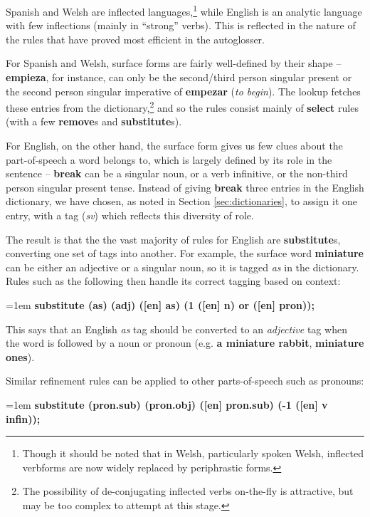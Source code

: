 \documentclass[11pt]{article}
\begin{document}
Spanish and Welsh are inflected languages,\footnote{Though it should be noted that in Welsh, particularly spoken Welsh, inflected verbforms are now widely replaced by periphrastic forms.} while English is an analytic language with few inflections (mainly in ``strong'' verbs).  This is reflected in the nature of the rules that have proved most efficient in the autoglosser.

For Spanish and Welsh, surface forms are fairly well-defined by their shape -- \textbf{empieza}, for instance, can only be the second/third person singular present or the second person singular imperative of \textbf{empezar} (\textit{to begin}).  The lookup fetches these entries from the dictionary,\footnote{The possibility of de-conjugating inflected verbs on-the-fly is attractive, but may be too complex to attempt at this stage.} and so the rules consist mainly of \textbf{select} rules (with a few \textbf{remove}s and \textbf{substitute}s).

For English, on the other hand, the surface form gives us few clues about the part-of-speech a word belongs to, which is largely defined by its role in the sentence -- \textbf{break} can be a singular noun, or a verb infinitive, or the non-third person singular present tense.  Instead of giving \textbf{break} three entries in the English dictionary, we have chosen, as noted in Section  \ref{sec:dictionaries},  to assign it one entry, with a tag (\textit{sv}) which reflects this diversity of role.  

The result is that the the vast majority of rules for English are \textbf{substitute}s, converting one set of tags into another.  For example, the surface word \textbf{miniature} can be either an adjective or a singular noun, so it is tagged \textit{as} in the dictionary.  Rules such as the following then handle its correct tagging based on context:

\noindent
\hangindent=1em
\textbf{substitute (as) (adj) ([en] as) (1 ([en] n) or ([en] pron));}

\noindent This says that an English \textit{as} tag should be converted to an \textit{adjective} tag when the word is followed by a noun or pronoun (e.g. \textbf{a miniature rabbit}, \textbf{miniature ones}).

Similar refinement rules can be applied to other parts-of-speech such as pronouns:
 
\noindent
\hangindent=1em
\textbf{substitute (pron.sub) (pron.obj) ([en] pron.sub) (-1 ([en] v infin));}
\end{document}
